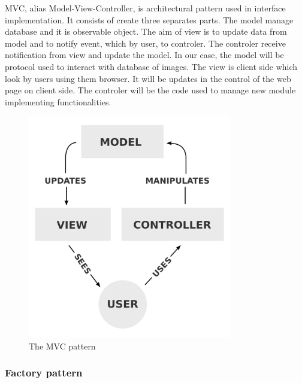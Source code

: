 MVC, alias Model-View-Controller, is architectural pattern used in interface implementation.
It consists of create three separates parts. The model manage database and it is observable
object. The aim of view is to update data from model and to notify event, which by user,
to controler. The controler receive notification from view and update the model.
\setlength{\parindent}{0cm}
In our case, the model will be protocol used to interact with database of images.
The view is client side which look by users using them browser.
It will be updates in the control of the web page on client side.
The controler will be the code used to manage new module implementing functionalities.



\begin{figure}[H]
  \centering
  \includegraphics[width=3.5in]{blobs/images/MVC-Process}
  \caption{The MVC pattern}
  \label{img:MVC-Process}
\end{figure}

\subsubsection{Factory pattern}
\setlength{\parindent}{1cm}
\hspace{1cm}

